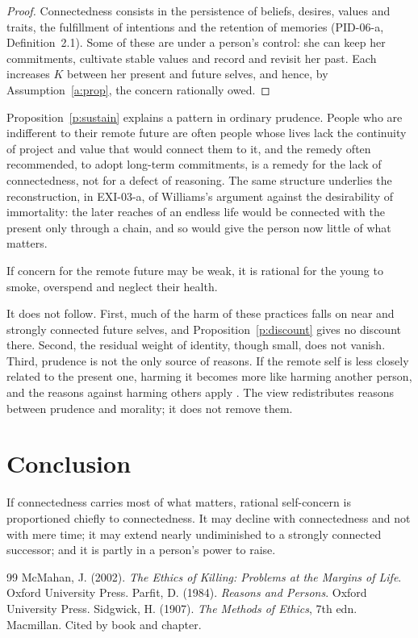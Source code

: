 \documentclass{situationist-preprint}
\begin{document}
\begin{proof}
Connectedness consists in the persistence of beliefs, desires, values and traits, the fulfillment of intentions and the retention of memories (PID-06-a, Definition~2.1). Some of these are under a person's control: she can keep her commitments, cultivate stable values and record and revisit her past. Each increases $K$ between her present and future selves, and hence, by Assumption~\ref{a:prop}, the concern rationally owed.
\end{proof}

Proposition~\ref{p:sustain} explains a pattern in ordinary prudence. People who are indifferent to their remote future are often people whose lives lack the continuity of project and value that would connect them to it, and the remedy often recommended, to adopt long-term commitments, is a remedy for the lack of connectedness, not for a defect of reasoning. The same structure underlies the reconstruction, in EXI-03-a, of Williams's argument against the desirability of immortality: the later reaches of an endless life would be connected with the present only through a chain, and so would give the person now little of what matters.

\begin{objection}
If concern for the remote future may be weak, it is rational for the young to smoke, overspend and neglect their health.
\end{objection}

\begin{reply}
It does not follow. First, much of the harm of these practices falls on near and strongly connected future selves, and Proposition~\ref{p:discount} gives no discount there. Second, the residual weight of identity, though small, does not vanish. Third, prudence is not the only source of reasons. If the remote self is less closely related to the present one, harming it becomes more like harming another person, and the reasons against harming others apply \citep[ch.~15]{Parfit1984}. The view redistributes reasons between prudence and morality; it does not remove them.
\end{reply}

\section{Conclusion}

If connectedness carries most of what matters, rational self-concern is proportioned chiefly to connectedness. It may decline with connectedness and not with mere time; it may extend nearly undiminished to a strongly connected successor; and it is partly in a person's power to raise.

\begin{thebibliography}{99}\small
{} McMahan, J. (2002). \emph{The Ethics of Killing: Problems at the Margins of Life}. Oxford University Press.
 Parfit, D. (1984). \emph{Reasons and Persons}. Oxford University Press.
 Sidgwick, H. (1907). \emph{The Methods of Ethics}, 7th edn. Macmillan. Cited by book and chapter.
\end{thebibliography}
\end{document}
